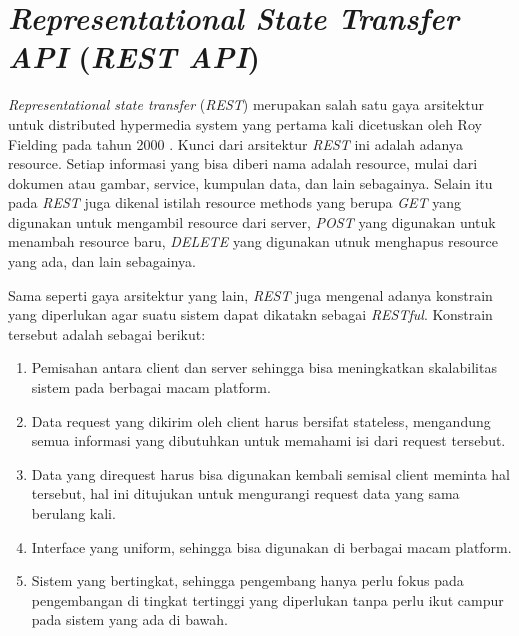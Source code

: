 \section{\emph{Representational State Transfer API} (\emph{REST API})}
\vspace{1ex}

\emph{Representational state transfer} (\emph{REST}) merupakan salah satu gaya arsitektur untuk distributed hypermedia system yang pertama kali dicetuskan oleh Roy Fielding pada tahun 2000 \citep{rest}.
Kunci dari arsitektur \emph{REST} ini adalah adanya resource.
Setiap informasi yang bisa diberi nama adalah resource, mulai dari dokumen atau gambar, service, kumpulan data, dan lain sebagainya.
Selain itu pada \emph{REST} juga dikenal istilah resource methods yang berupa \emph{GET} yang digunakan untuk mengambil resource dari server, \emph{POST} yang digunakan untuk menambah resource baru, \emph{DELETE} yang digunakan utnuk menghapus resource yang ada, dan lain sebagainya.
\vspace{0.5ex}

Sama seperti gaya arsitektur yang lain, \emph{REST} juga mengenal adanya konstrain yang diperlukan agar suatu sistem dapat dikatakn sebagai \emph{RESTful}.
Konstrain tersebut adalah sebagai berikut:
\vspace{0.5ex}

\begin{enumerate}[nolistsep]

  \item Pemisahan antara client dan server sehingga bisa meningkatkan skalabilitas sistem pada berbagai macam platform.
  \vspace{0.5ex}

  \item Data request yang dikirim oleh client harus bersifat stateless, mengandung semua informasi yang dibutuhkan untuk memahami isi dari request tersebut.
  \vspace{0.5ex}

  \item Data yang direquest harus bisa digunakan kembali semisal client meminta hal tersebut, hal ini ditujukan untuk mengurangi request data yang sama berulang kali.
  \vspace{0.5ex}

  \item Interface yang uniform, sehingga bisa digunakan di berbagai macam platform.
  \vspace{0.5ex}

  \item Sistem yang bertingkat, sehingga pengembang hanya perlu fokus pada pengembangan di tingkat tertinggi yang diperlukan tanpa perlu ikut campur pada sistem yang ada di bawah.
  \vspace{0.5ex}

\end{enumerate}
\vspace{0.5ex}

